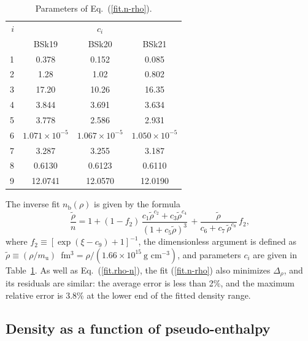 \documentclass{aa}
\newcommand{\gcc}{\mbox{g cm$^{-3}$}}
\newcommand{\req}[1]{Eq.~(\ref{#1})}
\newcommand{\nb}{n_\mathrm{b}}
\begin{document}
\begin{table}
\centering
\caption[]{Parameters of \req{fit.n-rho}.}
\label{tab:fit.n-rho}
\begin{tabular}{r|ccc}
\hline\hline\rule[-1.4ex]{0pt}{4.3ex}
$i$ & \multicolumn{3}{c}{$c_i$}\\
  & BSk19 & BSk20 & BSk21  \\
\hline\rule{0pt}{2.7ex}
1  & 0.378 &     0.152 &     0.085 \\
2  & 1.28 &      1.02 &      0.802 \\
3  & 17.20 &     10.26 &     16.35 \\
4  & 3.844 &     3.691 &     3.634 \\
5  & 3.778 &     2.586 &     2.931 \\
6  & $1.071\times10^{-5}$ & $1.067\times10^{-5}$ & $1.050\times10^{-5}$ \\
7  & 3.287 &     3.255 &     3.187 \\
8  & 0.6130 &    0.6123 &    0.6110 \\
9  & 12.0741 &   12.0570 &   12.0190 \\
\hline\hline
\end{tabular}
\end{table}

The inverse fit $\nb(\rho)$ is given by the formula
\begin{equation}
   \frac{\tilde{\rho}}{n} = 1+
     (1-f_2)\,\frac{c_1 \tilde{\rho}^{c_2}
      + c_3 \tilde{\rho}^{c_4}}{(1+c_5 \tilde{\rho})^3}\,
     +  
    \frac{\tilde{\rho}}{c_6 + c_7\,\tilde{\rho}^{c_8}}\,f_2
 ,
\label{fit.n-rho}
\end{equation}
where $f_2 \equiv \left[\exp(\xi-c_9)+1\right]^{-1}$, the
dimensionless argument is defined as $\tilde{\rho} \equiv
(\rho/m_\mathrm{u})$~fm$^3 = \rho/(1.66\times10^{15}~\gcc)$,
and parameters $c_i$ are given in Table~\ref{tab:fit.n-rho}.
As well as  \req{fit.rho-n}, the fit (\ref{fit.n-rho}) also
minimizes $\Delta_\rho$, and its residuals are similar: the
average error is less than 2\%, and the maximum relative
error is 3.8\% at the lower end of the fitted density range.

\subsection{Density as a function of pseudo-enthalpy}
\end{document}
